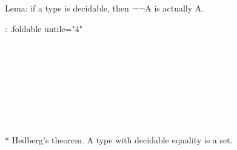 Lema: if a type is decidable, then ¬¬A is actually A.

{: .foldable untile="4" }
\begin{code}      %
%
\>[4]\<%
\\
\>[4][@{}l@{\AgdaIndent{0}}]%
\>[6]\AgdaSymbol{:}\AgdaSpace{}%
\AgdaSymbol{(}\AgdaSpace{}%
\AgdaOperator{\AgdaDatatype{+}}\AgdaSpace{}%
\AgdaSpace{}%
\AgdaSymbol{)}\<%
\\
%
\>[6]\AgdaComment{---------------}\<%
\\
%
\>[6]\AgdaSpace{}%
\AgdaSymbol{(}\AgdaSpace{}%
\AgdaSymbol{(}\AgdaSpace{}%
\AgdaSymbol{)}\AgdaSpace{}%
\AgdaSpace{}%
\AgdaSymbol{)}\<%
\\
%
\\[\AgdaEmptyExtraSkip]%
%
\>[4]\AgdaSpace{}%
\AgdaSymbol{(}\AgdaSpace{}%
\AgdaSymbol{)}\AgdaSpace{}%
\AgdaSymbol{\AgdaUnderscore{}}\AgdaSpace{}%
\AgdaSymbol{=}\AgdaSpace{}%
\<%
\\
%
\>[4]\AgdaSpace{}%
\AgdaSymbol{(}\AgdaSpace{}%
\AgdaSymbol{)}\AgdaSpace{}%
\AgdaSpace{}%
\AgdaSymbol{=}\AgdaSpace{}%
\AgdaSpace{}%
\AgdaSymbol{(}\AgdaSpace{}%
\AgdaSymbol{)}\<%
\\
%
\>[2]\AgdaSpace{}%
\AgdaSpace{}%
\<%
\end{code}

* Hedberg's theorem. A type with decidable equality is a set.

